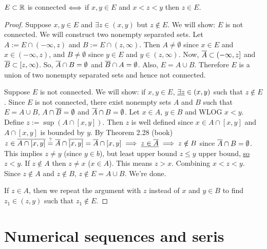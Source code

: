 \documentclass[]{article}
\begin{document}
\begin{theorem}
	$E\subset\mathbb{R}$ is connected $\Longleftrightarrow$ if $x,y\in E$ and $x<z<y$ then $z\in E$.
\end{theorem}
\begin{proof}
	\say{$\implies$} Suppose $x,y\in E$ and $\exists z\in (x,y)$ but $z\notin E$.
	We will show: $E$ is not connected. We will construct two nonempty separated sets.
	Let $A:= E\cap (-\infty,z)$ and $B:= E\cap(z,\infty)$.
	Then $A\neq\emptyset$ since $x\in E$ and $x\in(-\infty,z)$, and $B\neq\emptyset$ since $y\in E$ and $y\in(z,\infty)$.
	Now, $\overline{A} \subset (-\infty,z]$ and $\overline{B}\subset[z,\infty)$.
	So, $\overline{A}\cap B=\emptyset$ and $\overline{B}\cap A = \emptyset$.
	Also, $E = A\cup B$.
	Therefore $E$ is a union of two nonempty separated sets and hence not connected.

	\say{$\Lla$} Suppose $E$ is not connected. We will show: if $x,y\in E$, $\underline{\exists z}\in(x,y)$ such that $z\notin E$.
	Since $E$ is not connected, there exist nonempty sets $A$ and $B$ such that $E = A\cup B$, $A\cap\overline{B}=\emptyset$ and $\overline{A}\cap B = \emptyset$.
	Let $x\in A$, $y\in B$ and WLOG $x<y$.
	Define $z:= \sup(A\cap [x,y])$.
	Then $z$ is well defined since $x\in A\cap[x,y]$ and $A\cap[x,y]$ is bounded by $y$.
	By Theorem 2.28 (book) $z\in \overline{A\cap[x,y]}\overset{?}{=} \overline{A}\cap\overline{[x,y]} = \overline{A}\cap [x,y] \implies \underline{z\in \overline{A}} \implies z\notin B$ since $\overline{A}\cap B = \emptyset$. This implies $z\neq y$ (since $y\in b$), but least upper bound $z\leq y$ upper bound, \ul{so $z<y$}.
	If $z\notin A$ then $z\neq x$ ($x\in A$). This means \ul{$z>x$}. Combining $x<z<y$.
	Since $z\notin A$ and $z\notin B$, $z\notin E = A\cup B$. We're done.

	If \ul{$z\in A$}, then we repeat the argument with $z$ instead of $x$ and $y\in B$ to find $z_1\in (z,y)$ such that $z_1\notin E$.
\end{proof}

\section{Numerical sequences and seris}
\end{document}
